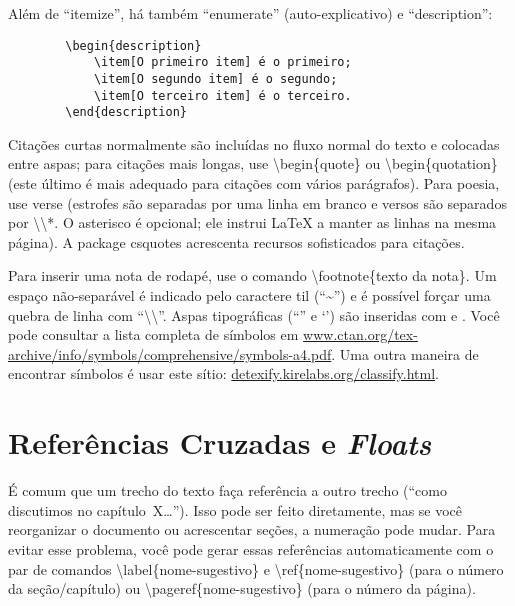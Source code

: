 Além de ``itemize'', há também ``enumerate'' (auto-explicativo) e ``description'':

\begin{verbatim}
        \begin{description}
            \item[O primeiro item] é o primeiro;
            \item[O segundo item] é o segundo;
            \item[O terceiro item] é o terceiro.
        \end{description}
\end{verbatim}

Citações curtas normalmente são incluídas no fluxo normal do texto e colocadas
entre aspas; para citações mais longas, use \textsf{\textbackslash{}begin\{quote\}}
ou \textsf{\textbackslash{}begin\{quotation\}} (este último é mais adequado
para citações com vários parágrafos). Para poesia, use \textsf{verse}
(estrofes são separadas por uma linha em branco e versos são separados por
\textsf{\textbackslash{}\textbackslash{}*}. O asterisco é opcional; ele
instrui \LaTeX{} a manter as linhas na mesma página). A package
\textsf{csquotes} acrescenta recursos sofisticados para citações.

Para inserir uma nota de rodapé, use o comando
\textsf{\textbackslash{}footnote\{texto da nota\}}.
Um espaço não-separável é indicado pelo caractere til (``\textasciitilde{}'')
e é possível forçar uma quebra de linha com
``\textsf{\textbackslash{}\textbackslash{}}''. Aspas tipográficas (``'' e `')
são inseridas com
\texttt{\textasciigrave\textasciigrave\textquotesingle\textquotesingle} e
\texttt{\textasciigrave\textquotesingle}. Você pode consultar a lista completa de
símbolos em \url{www.ctan.org/tex-archive/info/symbols/comprehensive/symbols-a4.pdf}.
Uma outra maneira de encontrar símbolos é usar este sítio: \url{detexify.kirelabs.org/classify.html}.

\section{Referências Cruzadas e \emph{Floats}}

É comum que um trecho do texto faça referência a outro trecho (``como
discutimos no capítulo~X\ldots''). Isso pode ser feito diretamente, mas
se você reorganizar o documento ou acrescentar seções, a numeração pode
mudar. Para evitar esse problema, você pode gerar essas referências
automaticamente com o par de comandos
\textsf{\textbackslash{}label\{nome-sugestivo\}} e
\textsf{\textbackslash{}ref\{nome-sugestivo\}} (para o número da
seção/capítulo) ou \textsf{\textbackslash{}pageref\{nome-sugestivo\}}
(para o número da página).

